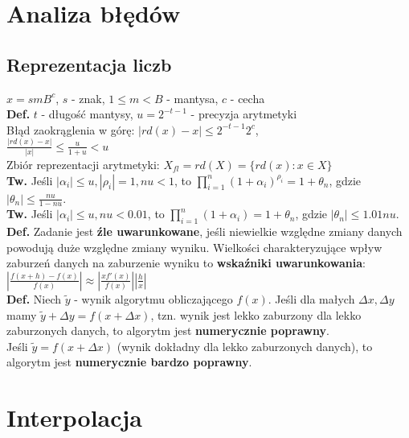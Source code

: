 \documentclass[a4paper,twocolumn]{article}
\begin{document}
\fontsize{7}{4}\selectfont


\section{Analiza błędów}
\subsection{Reprezentacja liczb}
$x = smB^c$, $s$ - znak, $1 \leq m < B$ - mantysa, $c$ - cecha \\
\textbf{Def.} $t$ - długość mantysy, $u = 2^{-t-1}$ - precyzja arytmetyki \\
Błąd zaokrąglenia w górę:
$|rd(x) - x| \leq 2^{-t-1} 2^c$, \\
$\frac{|rd(x) - x|}{|x|} \leq  \frac{u}{1+u} < u$ \\
Zbiór reprezentacji arytmetyki: $X_{fl} = rd(X) = \{rd(x) : x \in X \}$ \\
\textbf{Tw.} Jeśli $|\alpha_i| \leq u, |\rho_i| = 1, nu < 1$, to $\prod_{i = 1}^{n} (1 + \alpha_i)^{\rho_i} = 1 + \theta_n$, gdzie $|\theta_n| \leq \frac{nu}{1 - nu}$. \\
\textbf{Tw.} Jeśli $|\alpha_i| \leq u, nu < 0.01$, to $\prod_{i = 1}^{n} (1 + \alpha_i) = 1 + \theta_n$, gdzie $|\theta_n| \leq 1.01nu$. \\
\textbf{Def.} Zadanie jest \textbf{źle uwarunkowane}, jeśli niewielkie względne zmiany danych powodują duże względne zmiany wyniku. Wielkości charakteryzujące wpływ zaburzeń danych na zaburzenie wyniku to
\textbf{wskaźniki uwarunkowania}:\\
$|\frac{f(x+h)-f(x)}{f(x)}| \approx |\frac{xf'(x)}{f(x)}||\frac{h}{x}|$\\
\textbf{Def.} Niech $\tilde{y}$ - wynik algorytmu obliczającego $f(x)$. Jeśli dla małych $\Delta x, \Delta y$ mamy $\tilde{y} + \Delta y = f(x + \Delta x)$, tzn. wynik jest lekko zaburzony dla lekko zaburzonych danych, to algorytm jest \textbf{numerycznie poprawny}. \\
Jeśli $\tilde{y} = f(x + \Delta x)$ (wynik dokładny dla lekko zaburzonych danych), to algorytm jest \textbf{numerycznie bardzo poprawny}.\\
\section{Interpolacja}
\end{document}
